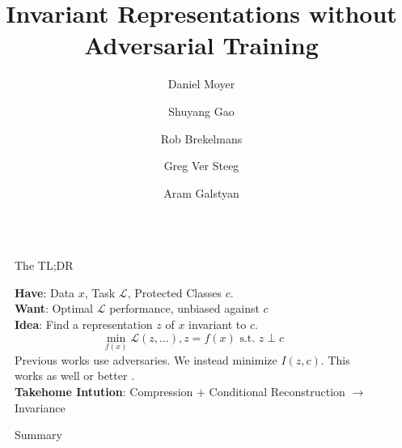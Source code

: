 \documentclass[final]{beamer}
\title{Invariant Representations without Adversarial Training}
\author{Daniel Moyer \and Shuyang Gao \and Rob Brekelmans \and  Greg Ver Steeg \and Aram Galstyan}
\institute[shortinst]{Information Sciences Institute, University of Southern California}
\newlength{\sepwidth}
\newlength{\colwidth}
\newcommand{\separatorcolumn}{\begin{column}{\sepwidth}\end{column}}
\begin{document}
\begin{frame}[t]
\begin{columns}[t]
\separatorcolumn

\begin{column}{\colwidth}

  \begin{alertblock}{The TL;DR}

    \textbf{Have}: Data $x$, Task $\mathcal{L}$, Protected Classes $c$.\\
    \textbf{Want}: Optimal $\mathcal{L}$ performance, unbiased against $c$\\
    \textbf{Idea}: Find a representation $z$ of $x$ invariant to $c$.\\
    \[\min_{f(x)} \mathcal{L}(z,\dots), z=f(x) \text{ s.t. } z \perp c  \]
    Previous works use adversaries. We instead minimize $I(z,c)$.
    This works as well or better \cite{moyer2018invariant}.\\[1em]

    \textbf{Takehome Intution}: Compression $+$ Conditional Reconstruction $\rightarrow$ Invariance \\[1em]

    \begin{center}
      
    \end{center}
    \vspace{-0.75cm}

  \end{alertblock}


  \begin{block}{Summary}

  \end{block}




\end{column}


\separatorcolumn



\begin{column}{\colwidth}


\end{column}
\end{columns}
\end{frame}
\end{document}
